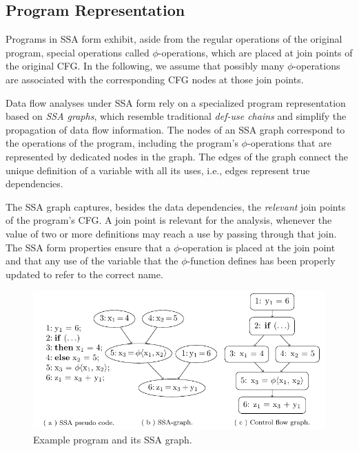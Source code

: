 \subsection{Program Representation}

Programs in SSA form exhibit, aside from the regular operations of the original
program, special operations called $\phi$-operations, which are placed at join
points of the original CFG. In the following, we assume that possibly many
$\phi$-operations are associated with the corresponding CFG nodes at those
join points.

Data flow analyses under SSA form rely on a specialized program representation
based on \emph{SSA graphs}, which resemble traditional \emph{def-use chains} and
simplify the propagation of data flow information. The nodes of an SSA graph
correspond to the operations of the program, including the program's
$\phi$-operations that are represented by dedicated nodes in the graph. The
edges of the graph connect the unique definition of a variable with all its
uses, i.e., edges represent true dependencies.

The SSA graph captures, besides the data
dependencies, the \emph{relevant} join points of the program's CFG. A join point
is relevant for the analysis, whenever the value of two or more definitions may
reach a use by passing through that join. The SSA form properties ensure that
a $\phi$-operation is placed at the join point and that any use of the variable
that the $\phi$-function defines has been properly updated to refer to the
correct name.

\begin{figure}[t]
  \includegraphics[trim=4.3mm 0 0 0]{ssa_graph}
  \caption{Example program and its SSA graph.}
  \label{novillo:fig:ssa_graph}
\end{figure}

